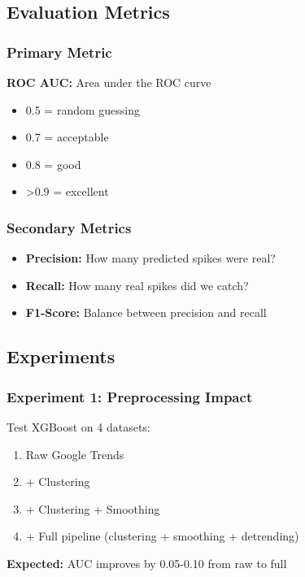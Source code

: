 \documentclass[12pt,a4paper]{article}
\begin{document}
\subsection{Evaluation Metrics}

\subsubsection{Primary Metric}

\textbf{ROC AUC:} Area under the ROC curve
\begin{itemize}
    \item 0.5 = random guessing
    \item 0.7 = acceptable
    \item 0.8 = good
    \item >0.9 = excellent
\end{itemize}

\subsubsection{Secondary Metrics}

\begin{itemize}
    \item \textbf{Precision:} How many predicted spikes were real?
    \item \textbf{Recall:} How many real spikes did we catch?
    \item \textbf{F1-Score:} Balance between precision and recall
\end{itemize}

\subsection{Experiments}

\subsubsection{Experiment 1: Preprocessing Impact}

Test XGBoost on 4 datasets:
\begin{enumerate}
    \item Raw Google Trends
    \item + Clustering
    \item + Clustering + Smoothing
    \item + Full pipeline (clustering + smoothing + detrending)
\end{enumerate}

\textbf{Expected:} AUC improves by 0.05-0.10 from raw to full
\end{document}
